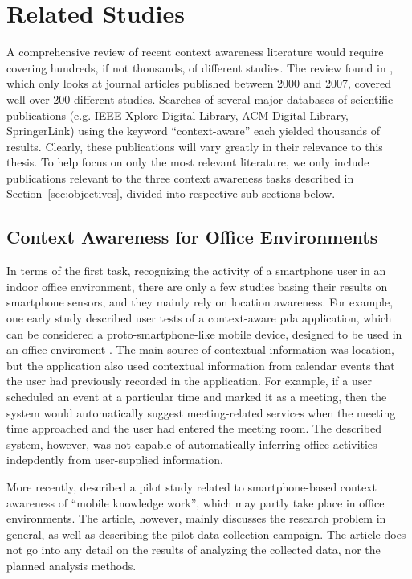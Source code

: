 \section{Related Studies}
\label{sec:literature}

A comprehensive review of recent context awareness literature would require covering hundreds, if not thousands, of different studies. The review found in \cite{Hong2009}, which only looks at journal articles published between 2000 and 2007, covered well over 200 different studies.  Searches of several major databases of scientific publications (e.g. IEEE Xplore Digital Library, ACM Digital Library, SpringerLink) using the keyword ``context-aware'' each yielded thousands of results. Clearly, these publications will vary greatly in their relevance to this thesis. To help focus on only the most relevant literature, we only include publications relevant to the three context awareness tasks described in Section~\ref{sec:objectives}, divided into respective sub-sections below.

\subsection{Context Awareness for Office Environments}
\label{sec:office-literature}

In terms of the first task, recognizing the activity of a smartphone user in an indoor office environment, there are only a few studies basing their results on smartphone sensors, and they mainly rely on location awareness. For example, one early study described user tests of a context-aware \gls{pda} application, which can be considered a proto-smartphone-like mobile device, designed to be used in an office enviroment \cite{Tahti2004}. The main source of contextual information was location, but the application also used contextual information from calendar events that the user had previously recorded in the application. For example, if a user scheduled an event at a particular time and marked it as a meeting, then the system would automatically suggest meeting-related services when the meeting time approached and the user had entered the meeting room. The described system, however, was not capable of automatically inferring office activities indepdently from user-supplied information.

More recently, \cite{heiskala2014research} described a pilot study related to smartphone-based context awareness of ``mobile knowledge work'', which may partly take place in office environments. The article, however, mainly discusses the research problem in general, as well as describing the pilot data collection campaign. The article does not go into any detail on the results of analyzing the collected data, nor the planned analysis methods.

